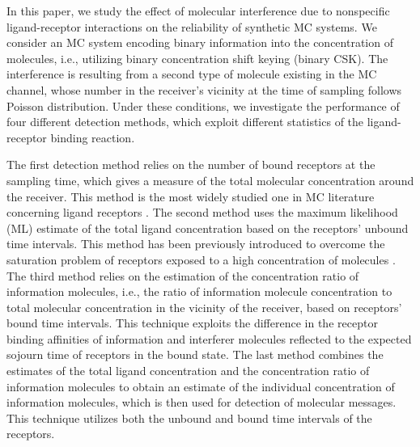 \documentclass[twocolumn]{IEEEtran}
\begin{document}












In this paper, we study the effect of molecular interference due to nonspecific ligand-receptor interactions on the reliability of synthetic MC systems. We consider an MC system encoding binary information into the concentration of molecules, i.e., utilizing binary concentration shift keying (binary CSK). The interference is resulting from a second type of molecule existing in the MC channel, whose number in the receiver's vicinity at the time of sampling follows Poisson distribution. Under these conditions, we investigate the performance of four different detection methods, which exploit different statistics of the ligand-receptor binding reaction. 

The first detection method relies on the number of bound receptors at the sampling time, which gives a measure of the total molecular concentration around the receiver. This method is the most widely studied one in MC literature concerning ligand receptors \cite{einolghozati2011capacity}.  The second method uses the maximum likelihood (ML) estimate of the total ligand concentration based on the receptors' unbound time intervals. This method has been previously introduced to overcome the saturation problem of receptors exposed to a high concentration of molecules \cite{kuscu2018maximum}. The third method relies on the estimation of the concentration ratio of information molecules, i.e., the ratio of information molecule concentration to total molecular concentration in the vicinity of the receiver, based on receptors' bound time intervals. This technique exploits the difference in the receptor binding affinities of information and interferer molecules reflected to the expected sojourn time of receptors in the bound state. The last method combines the estimates of the total ligand concentration and the concentration ratio of information molecules to obtain an estimate of the individual concentration of information molecules, which is then used for detection of molecular messages. This technique utilizes both the unbound and bound time intervals of the receptors. 
\end{document}
